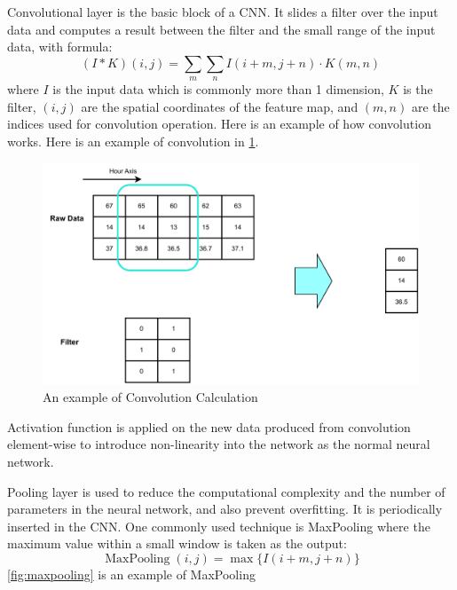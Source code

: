 \documentclass[12pt,a4paper,english
]{tunithesis}
\begin{document}
Convolutional layer is the basic block of a CNN. It slides a filter over the input data and computes a result between the filter and the small range of the input data, with formula:
\begin{equation*}
    (I * K)(i, j)=\sum_m \sum_n I(i+m, j+n) \cdot K(m, n)
\end{equation*}
where $I$ is the input data which is commonly more than 1 dimension, $K$ is the filter, $(i, j)$ are the spatial coordinates of the feature map, and $(m, n)$ are the indices used for convolution operation. Here is an example of how convolution works. Here is an example of convolution in \ref{fig:convolution}.

\begin{figure}
  \begin{center}
    \includegraphics[width=1\textwidth]{thesis/img/convolution.pdf}
  \end{center}
  \caption[Convolution]{An example of Convolution Calculation}
  \label{fig:convolution}
\end{figure}

Activation function is applied on the new data produced from convolution element-wise to introduce non-linearity into the network as the normal neural network.

Pooling layer is used to reduce the computational complexity and the number of parameters in the neural network, and also prevent overfitting. It is periodically inserted in the CNN. One commonly used technique is MaxPooling where the maximum value within a small window is taken as the output:
\begin{equation*}
    \operatorname{MaxPooling}(i, j)=\max \{I(i+m, j+n)\}
\end{equation*}
\ref{fig:maxpooling} is an example of MaxPooling
\end{document}
